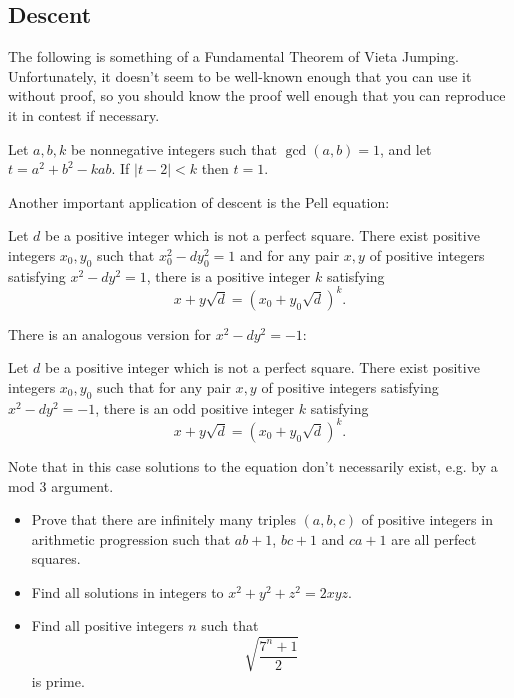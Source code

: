\subsection{Descent}
The following is something of a Fundamental Theorem of Vieta Jumping.
Unfortunately, it doesn't seem to be well-known enough that you can use it
without proof, so you should know the proof well enough that you can reproduce
it in contest if necessary.
\begin{result}{\label{r:a:n:d:1}}
  Let $a,b,k$ be nonnegative integers such that $\gcd(a,b)=1$,
    and let $t=a^2+b^2-kab$. If $|t-2|<k$ then $t=1$.
\end{result}
Another important application of descent is the Pell equation:
\begin{result}{\label{r:a:n:d:2}}
      Let $d$ be a positive integer which is not a perfect square.
      There exist positive integers $x_0,y_0$ such that $x_0^2-dy_0^2=1$ and 
      for any pair $x,y$ of
      positive integers satisfying $x^2-dy^2=1$, there is a positive integer $k$
      satisfying
      \[x+y\sqrt d=(x_0+y_0\sqrt d)^k.\]
\end{result}
There is an analogous version for $x^2-dy^2=-1$:
\begin{result}{\label{r:a:n:d:3}}
      Let $d$ be a positive integer which is not a perfect square.
      There exist positive integers $x_0,y_0$ such that 
      for any pair $x,y$ of
      positive integers satisfying $x^2-dy^2=-1$, there is an odd positive integer $k$
      satisfying
      \[x+y\sqrt d=(x_0+y_0\sqrt d)^k.\]
\end{result}
Note that in this case solutions to the equation don't necessarily exist, e.g.
by a mod 3 argument.
\begin{itemize}
  \item Prove that there are infinitely many triples $(a,b,c)$ of positive
    integers in arithmetic progression
    such that $ab+1$, $bc+1$ and $ca+1$ are all perfect squares.
  \item Find all solutions in integers to $x^2+y^2+z^2=2xyz$.
    \item Find all positive integers $n$ such that \[\sqrt{\frac{7^n+1}2}\] is
      prime.
\end{itemize}
